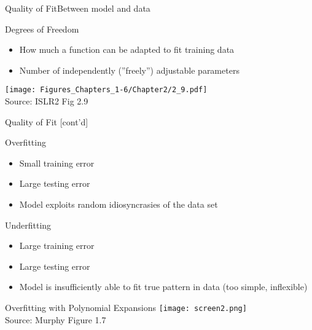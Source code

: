 \documentclass[ignorenonframetext,xcolor=x11names]{beamer}
\begin{document}
\begin{frame}{Quality of Fit}{Between model and data}
\begin{block}{Degrees of Freedom}
\begin{itemize} 
  \item How much a function can be adapted to fit training data
  \item Number of independently (''freely'') adjustable parameters
\end{itemize}
\end{block}

\centering
\texttt{[image: Figures\_Chapters\_1-6/Chapter2/2\_9.pdf]} \\

\scriptsize Source: ISLR2 Fig 2.9
\end{frame}


\begin{frame}{Quality of Fit \small [cont'd]}
\begin{block}{Overfitting}
  \begin{itemize}
     \item Small training error
     \item Large testing error
     \item Model exploits random idiosyncrasies of the data set
  \end{itemize}
\end{block}

\begin{block}{Underfitting}
  \begin{itemize}
     \item Large training error
     \item Large testing error
     \item Model is insufficiently able to fit true pattern in data (too simple, inflexible)
  \end{itemize}
\end{block}
\end{frame}

\begin{frame}{Overfitting with Polynomial Expansions}
\centering
\texttt{[image: screen2.png]} \\

\scriptsize Source: Murphy Figure 1.7
\end{frame}
\end{document}
